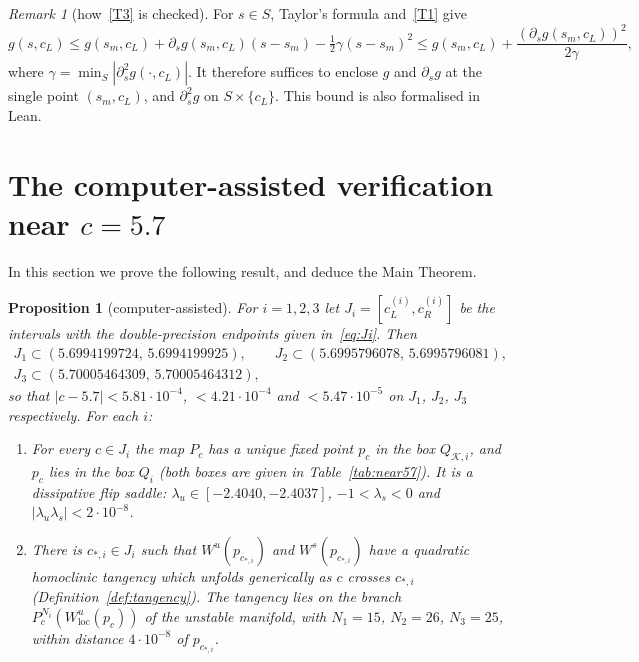 \documentclass[11pt]{amsart}
\newtheorem{proposition}[thm]{Proposition}
\theoremstyle{definition}
\theoremstyle{remark}
\newtheorem{remark}[thm]{Remark}
\newcommand{\Wu}{W^u}
\newcommand{\Ws}{W^s}
\newcommand{\loc}{\mathrm{loc}}
\newcommand{\Kr}{\mathcal{K}}
\begin{document}
\begin{remark}[how~\ref{T3} is checked]\label{rem:taylor}
For $s\in S$, Taylor's formula and~\ref{T1} give
\[
g(s,c_L)\le g(s_m,c_L)+\partial_sg(s_m,c_L)(s-s_m)-\tfrac12\gamma(s-s_m)^2
\le g(s_m,c_L)+\frac{(\partial_sg(s_m,c_L))^2}{2\gamma},
\]
where $\gamma=\min_S|\partial_s^2g(\cdot,c_L)|$. It therefore suffices to enclose $g$ and $\partial_sg$ at the
single point $(s_m,c_L)$, and $\partial_s^2g$ on $S\times\{c_L\}$. This bound is also formalised in Lean.
\end{remark}

\section{The computer-assisted verification near $c=5.7$}\label{sec:cap}

In this section we prove the following result, and deduce the Main Theorem.

\begin{proposition}[computer-assisted]\label{prop:tangency}
For $i=1,2,3$ let $J_i=[c^{(i)}_L,c^{(i)}_R]$ be the intervals with the double-precision endpoints
given in~\eqref{eq:Ji}. Then
\[
\begin{gathered}
J_1\subset(5.6994199724,\,5.6994199925),\qquad J_2\subset(5.6995796078,\,5.6995796081),\\
J_3\subset(5.70005464309,\,5.70005464312),
\end{gathered}
\]
so that $|c-5.7|<5.81\cdot10^{-4}$, $<4.21\cdot10^{-4}$ and $<5.47\cdot10^{-5}$ on $J_1$, $J_2$, $J_3$
respectively. For each $i$:
\begin{enumerate}[label=\textup{(\roman*)}]
\item For every $c\in J_i$ the map $P_c$ has a unique fixed point $p_c$ in the box $Q_{\Kr,i}$, and $p_c$
lies in the box $Q_i$ (both boxes are given in Table~\ref{tab:near57}). It is a dissipative flip saddle:
$\lambda_u\in[-2.4040,-2.4037]$, $-1<\lambda_s<0$ and $|\lambda_u\lambda_s|<2\cdot10^{-8}$.
\item There is $c_{*,i}\in J_i$ such that $\Wu(p_{c_{*,i}})$ and $\Ws(p_{c_{*,i}})$ have a quadratic
homoclinic tangency which unfolds generically as $c$ crosses $c_{*,i}$ (Definition~\ref{def:tangency}).
The tangency lies on the branch $P^{N_i}_{c}(\Wu_\loc(p_c))$ of the unstable manifold, with
$N_1=15$, $N_2=26$, $N_3=25$, within distance $4\cdot10^{-8}$ of $p_{c_{*,i}}$.
\end{enumerate}
\end{proposition}
\end{document}
